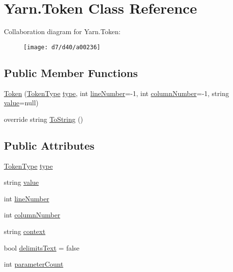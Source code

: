 \hypertarget{a00079}{\section{Yarn.\-Token Class Reference}
\label{a00079}
}


Collaboration diagram for Yarn.\-Token\-:
\nopagebreak
\begin{figure}[H]
\begin{center}
\leavevmode
\texttt{[image: d7/d40/a00236]}
\end{center}
\end{figure}
\subsection*{Public Member Functions}
\begin{DoxyCompactItemize}
\item 
\hyperlink{a00079_a5b307a925a1606db47866b31cea71386}{Token} (\hyperlink{a00026_a301aa7c866593a5b625a8fc158bbeace}{Token\-Type} \hyperlink{a00079_a471a25da67fda0524f2375f9a882aafa}{type}, int \hyperlink{a00079_a80fe710713201bb793a41452e314a721}{line\-Number}=-\/1, int \hyperlink{a00079_a9a0f0a8a7ab1e90ab48f15192323ffca}{column\-Number}=-\/1, string \hyperlink{a00079_a3df6b32d6190a639619a3f064c2154e2}{value}=null)
\item 
override string \hyperlink{a00079_abf676a737679ec2fb1dffd75dc4d7976}{To\-String} ()
\end{DoxyCompactItemize}
\subsection*{Public Attributes}
\begin{DoxyCompactItemize}
\item 
\hyperlink{a00026_a301aa7c866593a5b625a8fc158bbeace}{Token\-Type} \hyperlink{a00079_a471a25da67fda0524f2375f9a882aafa}{type}
\item 
string \hyperlink{a00079_a3df6b32d6190a639619a3f064c2154e2}{value}
\item 
int \hyperlink{a00079_a80fe710713201bb793a41452e314a721}{line\-Number}
\item 
int \hyperlink{a00079_a9a0f0a8a7ab1e90ab48f15192323ffca}{column\-Number}
\item 
string \hyperlink{a00079_a089d248c904a6e8366b81c2c47ff5af8}{context}
\item 
bool \hyperlink{a00079_af15d26fa4e6f276ab58ff66d3c4203da}{delimits\-Text} = false
\item 
int \hyperlink{a00079_adf11c0d29b66935a8d8109d6308d0488}{parameter\-Count}
\end{DoxyCompactItemize}


